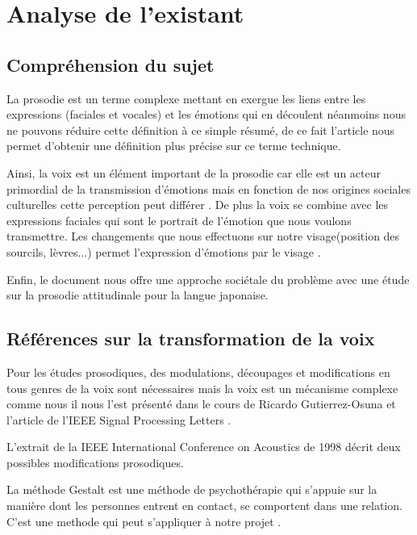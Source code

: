 \chapter{Analyse de l'existant}

\section{Compréhension du sujet}\label{comprehension_sujet}

La prosodie est un terme complexe mettant en exergue les liens entre les expressions (faciales et vocales) et les émotions qui en découlent néanmoins nous ne pouvons réduire cette définition à ce simple résumé, de ce fait l'article \cite{bachorowski1999 vocaux} nous permet d'obtenir une définition plus précise sur ce terme technique.

Ainsi, la voix est un élément important de la prosodie car elle est un acteur primordial de la transmission d'émotions mais en fonction de nos origines sociales culturelles cette perception peut différer \cite{auberge2002prosodie}.
De plus la voix se combine avec les expressions faciales qui sont le portrait de l'émotion que nous voulons transmettre. Les changements que nous effectuons sur notre visage(position des sourcils, lèvres...) permet l'expression d'émotions par le visage \cite{ekman2003unmasking} .

Enfin, le document \cite{fourer:hal-00992083} nous offre une approche sociétale du problème avec une étude sur la prosodie attitudinale pour la langue japonaise.


\section{Références sur la transformation de la voix}\label{ref_transfo_voix}

Pour les études prosodiques, des modulations, découpages et modifications en tous genres de la voix sont nécessaires mais la voix est un mécanisme complexe comme nous il nous l'est présenté dans le cours de Ricardo Gutierrez-Osuna \cite{Gutierrez-Osuna:ISP-PMS} et l'article de l'IEEE Signal Processing Letters \cite{haagen1994transformation}.

L'extrait de la IEEE International Conference on Acoustics de 1998 \cite{Acero:ICASSP98-II-881} décrit deux possibles modifications prosodiques.

La méthode Gestalt est une méthode de psychothérapie qui s'appuie sur la manière dont les personnes entrent en contact, se comportent dans une relation. C'est une methode qui peut s'appliquer à notre projet \cite{auberge2002gestalt}.

